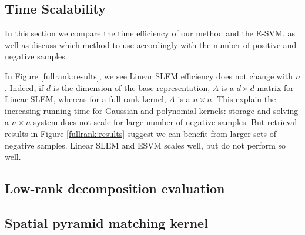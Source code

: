 
\subsection{Time Scalability} \label{time-scale}
In this section we compare the time efficiency of our method and the E-SVM, as well as discuss which method to use accordingly with the number of positive and negative samples.

In Figure \ref{fullrank:results}, we see Linear SLEM efficiency does not change with $n$.
Indeed, if $d$ is the dimension of the base representation, $A$ is a $d\times d$ matrix for Linear SLEM, whereas for a full rank kernel, $A$ is a $n\times n$.
This explain the increasing running time for Gaussian and polynomial kernels: storage and solving a $n\times n$ system does not scale for large number of negative samples.
But retrieval results in Figure \ref{fullrank:results} suggest we can benefit from larger sets of negative samples. Linear SLEM and ESVM scales well, but do not perform so well.

\vspace{3 mm}



\subsection{Low-rank decomposition evaluation}



\subsection{Spatial pyramid matching kernel}

